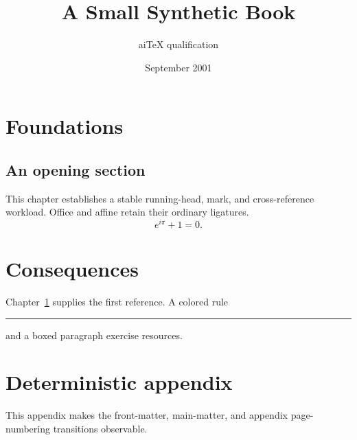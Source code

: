 \documentclass[11pt,twoside]{book}
\title{A Small Synthetic Book}
\author{aiTeX qualification}
\date{September 2001}
\begin{document}
\frontmatter
\maketitle
\tableofcontents
\mainmatter

\chapter{Foundations}\label{ch:foundations}
\section{An opening section}
This chapter establishes a stable running-head, mark, and cross-reference
workload. Office and affine retain their ordinary ligatures.
\[
  e^{i\pi}+1=0.
\]

\chapter{Consequences}
Chapter~\ref{ch:foundations} supplies the first reference. A colored rule
\textcolor{red}{\rule{72pt}{1pt}} and a boxed paragraph exercise resources.

\appendix
\chapter{Deterministic appendix}
This appendix makes the front-matter, main-matter, and appendix page-numbering
transitions observable.
\end{document}
